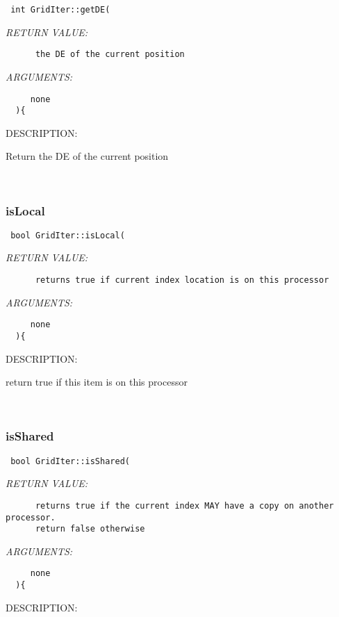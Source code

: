   
\begin{verbatim} int GridIter::getDE(\end{verbatim}{\em RETURN VALUE:}
\begin{verbatim}      the DE of the current position\end{verbatim}{\em ARGUMENTS:}
\begin{verbatim}     none  
  ){\end{verbatim}
{\sf DESCRIPTION:\\ }


   Return the DE of the current position
   
 
\mbox{}\hrulefill\
 
\subsubsection [isLocal] {isLocal }


  
\begin{verbatim} bool GridIter::isLocal(\end{verbatim}{\em RETURN VALUE:}
\begin{verbatim}      returns true if current index location is on this processor\end{verbatim}{\em ARGUMENTS:}
\begin{verbatim}     none  
  ){\end{verbatim}
{\sf DESCRIPTION:\\ }


   return true if this item is on this processor
   
 
\mbox{}\hrulefill\
 
\subsubsection [isShared] {isShared }


  
\begin{verbatim} bool GridIter::isShared(\end{verbatim}{\em RETURN VALUE:}
\begin{verbatim}      returns true if the current index MAY have a copy on another processor.  
      return false otherwise\end{verbatim}{\em ARGUMENTS:}
\begin{verbatim}     none  
  ){\end{verbatim}
{\sf DESCRIPTION:\\ }


